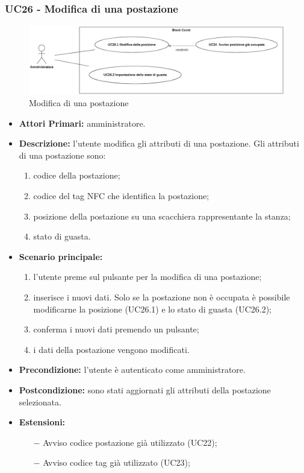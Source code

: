 \subsubsection{ UC26 - Modifica di una postazione}
\begin{figure}[H]
	\centering
	\includegraphics[width=18cm]{res/images/UC26-24.png}
	\caption{Modifica di una postazione}
\end{figure}
\begin{itemize}
	\item\textbf{Attori Primari:}
	amministratore.
	\item\textbf{Descrizione:}
	l'utente modifica gli attributi di una postazione.
	Gli attributi di una postazione sono:
	\begin{enumerate}
		\item codice della postazione;
		\item codice del tag NFC che identifica la postazione;
		\item posizione della postazione su una scacchiera rappresentante la stanza;
		\item stato di guasta.
	\end{enumerate}
	\item\textbf{Scenario principale:} 
	\begin{enumerate}
		\item l'utente preme sul pulsante per la modifica di una postazione;
		\item inserisce i nuovi dati. Solo se la postazione non è occupata è possibile modificarne la posizione (UC26.1) e lo stato di guasta (UC26.2);
		\item conferma i nuovi dati premendo un pulsante;
		\item i dati della postazione vengono modificati.
	\end{enumerate}
	\item\textbf{Precondizione:} 
	l'utente è autenticato come amministratore.
	\item\textbf{Postcondizione:}
	sono stati aggiornati gli attributi della postazione selezionata.
	\item\textbf{Estensioni:}
	\begin{itemize}
		\item[$-$] Avviso codice postazione già utilizzato (UC22);
		\item[$-$] Avviso codice tag già utilizzato (UC23);
	\end{itemize}
\end{itemize}

